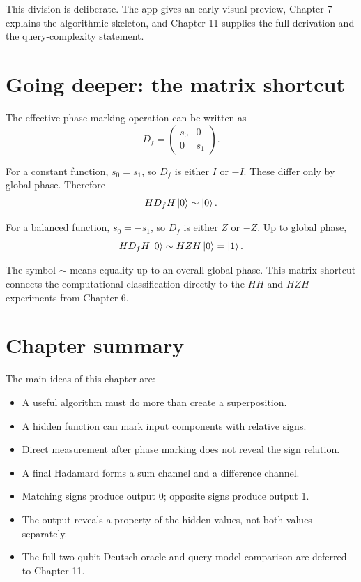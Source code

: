 This division is deliberate. The app gives an early visual preview, Chapter 7 explains the algorithmic skeleton, and Chapter 11 supplies the full derivation and the query-complexity statement.

\section{Going deeper: the matrix shortcut}
\label{sec:ch07-going-deeper}

\begin{goingdeeper}
The effective phase-marking operation can be written as
\begin{equation}
D_f=
\begin{pmatrix}
s_0 & 0\\
0 & s_1
\end{pmatrix}.
\end{equation}

For a constant function, $s_0=s_1$, so $D_f$ is either $I$ or $-I$. These differ only by global phase. Therefore
\begin{equation}
H D_f H\ket{0} \sim \ket{0}.
\end{equation}

For a balanced function, $s_0=-s_1$, so $D_f$ is either $Z$ or $-Z$. Up to global phase,
\begin{equation}
H D_f H\ket{0} \sim H Z H\ket{0}=\ket{1}.
\end{equation}

The symbol $\sim$ means equality up to an overall global phase. This matrix shortcut connects the computational classification directly to the $H H$ and $H Z H$ experiments from Chapter 6.
\end{goingdeeper}

\section{Chapter summary}
\label{sec:ch07-summary}

The main ideas of this chapter are:
\begin{itemize}
  \item A useful algorithm must do more than create a superposition.
  \item A hidden function can mark input components with relative signs.
  \item Direct measurement after phase marking does not reveal the sign relation.
  \item A final Hadamard forms a sum channel and a difference channel.
  \item Matching signs produce output 0; opposite signs produce output 1.
  \item The output reveals a property of the hidden values, not both values separately.
  \item The full two-qubit Deutsch oracle and query-model comparison are deferred to Chapter 11.
\end{itemize}


